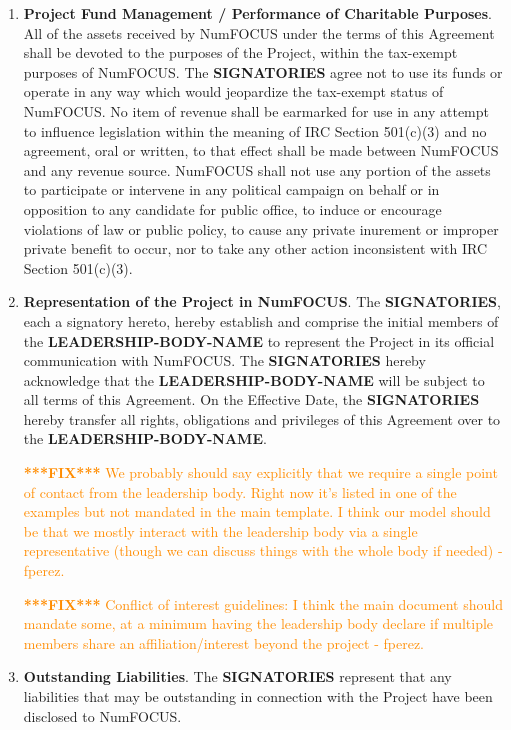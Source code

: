 \documentclass[english,letterpaper,12pt]{article}
\newcommand{\fix}[1]{
  \textcolor{darkorange} { \textbf{***FIX***} #1 } }
\newcommand{\signatories}{\textbf{SIGNATORIES}}
\newcommand{\leadershipbody}{\textbf{LEADERSHIP-BODY-NAME}}
\begin{document}
\begin{enumerate}[label=\arabic*.,ref=\S~\arabic*]
\item \textbf{Project Fund Management / Performance of Charitable
  Purposes}. \label{CharitablePurpose} All of the assets received by NumFOCUS
  under the terms of this Agreement shall be devoted to the purposes of the
  Project, within the tax-exempt purposes of NumFOCUS. The \signatories{} agree
  not to use its funds or operate in any way which would jeopardize the
  tax-exempt status of NumFOCUS. No item of revenue shall be earmarked for use
  in any attempt to influence legislation within the meaning of IRC Section
  501(c)(3) and no agreement, oral or written, to that effect shall be made
  between NumFOCUS and any revenue source. NumFOCUS shall not use any portion
  of the assets to participate or intervene in any political campaign on behalf
  or in opposition to any candidate for public office, to induce or encourage
  violations of law or public policy, to cause any private inurement or
  improper private benefit to occur, nor to take any other action inconsistent
  with IRC Section 501(c)(3).

\item \textbf{Representation of the Project in
  NumFOCUS}. \label{Representation}The \signatories{}, each a signatory hereto,
  hereby establish and comprise the initial members of the \leadershipbody{} to
  represent the Project in its official communication with NumFOCUS.  The
  \signatories{} hereby acknowledge that the \leadershipbody{} will be subject
  to all terms of this Agreement.  On the Effective Date, the \signatories{}
  hereby transfer all rights, obligations and privileges of this Agreement over
  to the \leadershipbody{}.

\fix{We probably should say explicitly that we require a single point of
  contact from the leadership body. Right now it's listed in one of the
  examples but not mandated in the main template. I think our model should be
  that we mostly interact with the leadership body via a single representative
  (though we can discuss things with the whole body if needed) - fperez.}

\fix{Conflict of interest guidelines: I think the main document should mandate
  some, at a minimum having the leadership body declare if multiple members
  share an affiliation/interest beyond the project - fperez.}



\item \textbf{Outstanding Liabilities}. The \signatories{} represent that any
  liabilities that may be outstanding in connection with the Project have been
  disclosed to NumFOCUS.


\end{enumerate}
\end{document}
